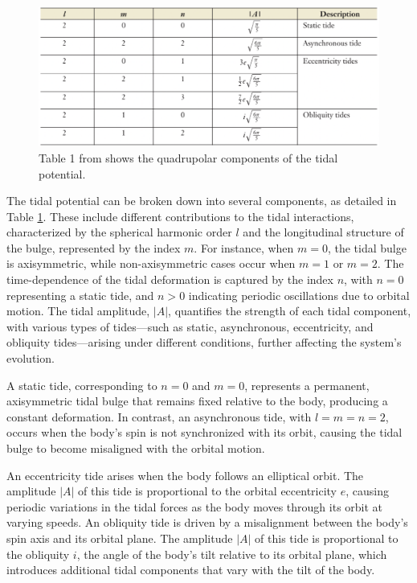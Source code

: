 \documentclass[oneside,12pt]{amsart}
\numberwithin{page}{section}
\begin{document}
\begin{figure}[htbp]
    \centering
    \includegraphics[width=\linewidth]{figs/ogilvie_tbl1.png}
    \caption{Table 1 from \citep{ogilvie2014tidal} shows the quadrupolar components of the tidal potential. }
    \label{fig:ogilvie-tbl1}
\end{figure}

The tidal potential can be broken down into several components, as detailed in Table \ref{fig:ogilvie-tbl1}. These include different contributions to the tidal interactions, characterized by the spherical harmonic order $l$ and the longitudinal structure of the bulge, represented by the index $m$. For instance, when $m = 0$, the tidal bulge is axisymmetric, while non-axisymmetric cases occur when $m = 1$ or $m = 2$. The time-dependence of the tidal deformation is captured by the index $n$, with $n = 0$ representing a static tide, and $n > 0$ indicating periodic oscillations due to orbital motion. The tidal amplitude, $|A|$, quantifies the strength of each tidal component, with various types of tides—such as static, asynchronous, eccentricity, and obliquity tides—arising under different conditions, further affecting the system’s evolution.

A static tide, corresponding to $n=0$ and $m=0$, represents a permanent, axisymmetric tidal bulge that remains fixed relative to the body, producing a constant deformation. In contrast, an asynchronous tide, with $l=m=n=2$, occurs when the body’s spin is not synchronized with its orbit, causing the tidal bulge to become misaligned with the orbital motion.

An eccentricity tide arises when the body follows an elliptical orbit. The amplitude $|A|$ of this tide is proportional to the orbital eccentricity $e$, causing periodic variations in the tidal forces as the body moves through its orbit at varying speeds. An obliquity tide is driven by a misalignment between the body’s spin axis and its orbital plane. The amplitude $|A|$ of this tide is proportional to the obliquity $i$, the angle of the body's tilt relative to its orbital plane, which introduces additional tidal components that vary with the tilt of the body.
\end{document}
